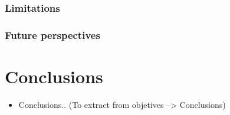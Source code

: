 \documentclass[11pt, b5paper,twoside]{tesi_upf}
\begin{document}
\subsubsection{Limitations} 
 
\subsubsection{Future perspectives}
 
 \clearpage
\section{Conclusions}
 
 
 \begin{itemize}
 
 \item Conclusions.. (To extract from objetives --> Conclusions)
 
 \end{itemize}
 
 
 
 


%



\backmatter
\printindex

\printbibliography
\end{document}
